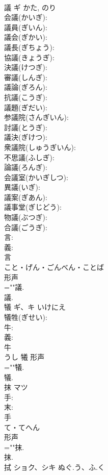 \documentclass[8pt]{extreport}
\begin{document}
\begin{CJK}{UTF8}{min}
\\	議	ギ		かた, のり	
\\	会議(かいぎ): 
\\	議員(ぎいん): 
\\	議会(ぎかい): 
\\	議長(ぎちょう): 
\\	協議(きょうぎ): 
\\	決議(けつぎ): 
\\	審議(しんぎ): 
\\	議論(ぎろん): 
\\	抗議(こうぎ): 
\\	議題(ぎだい): 
\\	参議院(さんぎいん): 
\\	討議(とうぎ): 
\\	議決(ぎけつ): 
\\	衆議院(しゅうぎいん): 
\\	不思議(ふしぎ): 
\\	論議(ろんぎ): 
\\	会議室(かいぎしつ): 
\\	異議(いぎ): 
\\	議案(ぎあん): 
\\	議事堂(ぎじどう): 
\\	物議(ぶつぎ): 
\\	合議(ごうぎ): 
\\	言: 
\\	義: 
\\	言	
\\	こと・げん・ごんべん・ことば	
\\	形声 
\\	=""議.
\\	議.
\\	犠	ギ、キ	いけにえ		
\\	犠牲(ぎせい): 
\\	牛: 
\\	義: 
\\	牛	
\\	うし	犧	形声 
\\	=""犠.
\\	犠.
\\	抹	マツ			
\\	手: 
\\	末: 
\\	手	
\\	て・てへん	
\\	形声 
\\	=""抹.
\\	抹.
\\	拭	ショク、シキ	ぬぐ.う、ふ.く		

\end{CJK}
\end{document}
